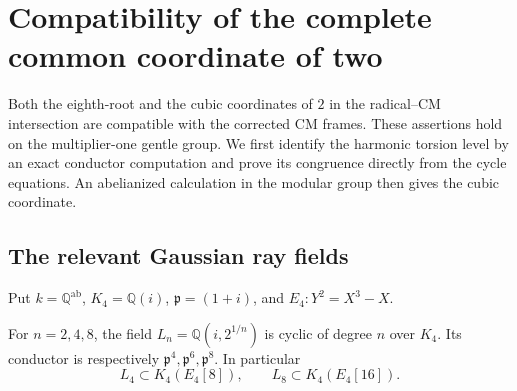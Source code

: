 \section{Compatibility of the complete common coordinate of two}
\label{sec:eighth-two-compatibility}

Both the eighth-root and the cubic coordinates of $2$ in the
radical--CM intersection are compatible with the corrected CM
frames.  These assertions hold on the multiplier-one gentle group.
We first identify the harmonic torsion level by an exact conductor
computation and prove its congruence directly from the cycle
equations.  An abelianized calculation in the modular group then
gives the cubic coordinate.

\subsection{The relevant Gaussian ray fields}

Put $k=\mathbb Q^{\mathrm{ab}}$, $K_4=\mathbb Q(i)$,
$\mathfrak p=(1+i)$, and $E_4:Y^2=X^3-X$.

\begin{lemma}\label{lem:eighth-two-conductor}
For $n=2,4,8$, the field
$L_n=\mathbb Q(i,2^{1/n})$ is cyclic of degree $n$ over $K_4$.
Its conductor is respectively
$\mathfrak p^4,\mathfrak p^6,\mathfrak p^8$.
In particular
\[
 L_4\subset K_4(E_4[8]),\qquad
 L_8\subset K_4(E_4[16]).
\]
\end{lemma}


